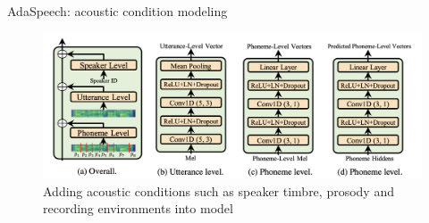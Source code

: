\begin{frame}{AdaSpeech: acoustic condition modeling}
    \begin{figure}
    	\centering
    	\includegraphics[width=0.99\linewidth]{figs/adaspeech_acoustic.png}
    	\caption{Adding acoustic conditions such as speaker timbre, prosody and recording environments into model}
    \end{figure}
    

\end{frame}

 

